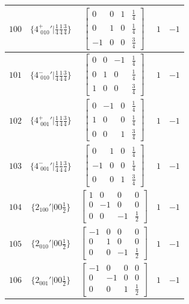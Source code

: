 \documentclass[fleqn,8pt]{jsarticle}
\begin{document}
\begin{longtable}{ccccc}
$ 100 $ & $ \{4^{+}_{\,\,010}{}'|\frac{1}{4} \frac{1}{4} \frac{3}{4}\} $ & $ \begin{bmatrix} 0 & 0 & 1 & \frac{1}{4} \\ 0 & 1 & 0 & \frac{1}{4} \\ -1 & 0 & 0 & \frac{3}{4} \end{bmatrix} $ & $ 1 $ & $ -1 $ \\ \hline
$ 101 $ & $ \{4^{-}_{\,\,010}{}'|\frac{1}{4} \frac{1}{4} \frac{3}{4}\} $ & $ \begin{bmatrix} 0 & 0 & -1 & \frac{1}{4} \\ 0 & 1 & 0 & \frac{1}{4} \\ 1 & 0 & 0 & \frac{3}{4} \end{bmatrix} $ & $ 1 $ & $ -1 $ \\ \hline
$ 102 $ & $ \{4^{+}_{\,\,001}{}'|\frac{1}{4} \frac{1}{4} \frac{3}{4}\} $ & $ \begin{bmatrix} 0 & -1 & 0 & \frac{1}{4} \\ 1 & 0 & 0 & \frac{1}{4} \\ 0 & 0 & 1 & \frac{3}{4} \end{bmatrix} $ & $ 1 $ & $ -1 $ \\ \hline
$ 103 $ & $ \{4^{-}_{\,\,001}{}'|\frac{1}{4} \frac{1}{4} \frac{3}{4}\} $ & $ \begin{bmatrix} 0 & 1 & 0 & \frac{1}{4} \\ -1 & 0 & 0 & \frac{1}{4} \\ 0 & 0 & 1 & \frac{3}{4} \end{bmatrix} $ & $ 1 $ & $ -1 $ \\ \hline
$ 104 $ & $ \{2{}_{100}{}'|0 0 \frac{1}{2}\} $ & $ \begin{bmatrix} 1 & 0 & 0 & 0 \\ 0 & -1 & 0 & 0 \\ 0 & 0 & -1 & \frac{1}{2} \end{bmatrix} $ & $ 1 $ & $ -1 $ \\ \hline
$ 105 $ & $ \{2{}_{010}{}'|0 0 \frac{1}{2}\} $ & $ \begin{bmatrix} -1 & 0 & 0 & 0 \\ 0 & 1 & 0 & 0 \\ 0 & 0 & -1 & \frac{1}{2} \end{bmatrix} $ & $ 1 $ & $ -1 $ \\ \hline
$ 106 $ & $ \{2{}_{001}{}'|0 0 \frac{1}{2}\} $ & $ \begin{bmatrix} -1 & 0 & 0 & 0 \\ 0 & -1 & 0 & 0 \\ 0 & 0 & 1 & \frac{1}{2} \end{bmatrix} $ & $ 1 $ & $ -1 $ \\ \hline

\end{longtable}
\end{document}
